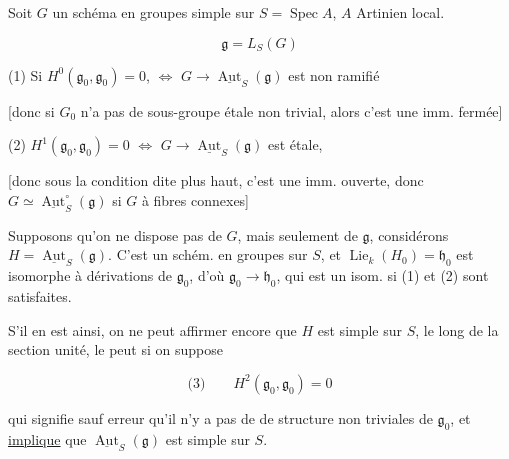
Soit \(G\) un schéma en groupes simple sur \(S=\operatorname{Spec} A\), \(A\) Artinien local.

\[
\mathfrak g=L_S(G)
\]

(1) Si \(H^0(\mathfrak g_0,\mathfrak g_0)=0\), \(\Longleftrightarrow\) \(G\longrightarrow\underline{\operatorname{Aut}}_S(\mathfrak g)\) est  non ramifié

[donc si \(G_0\) n'a pas de sous-groupe  étale  non trivial, alors c'est une imm. fermée]

(2)   \(H^1(\mathfrak g_0,\mathfrak g_0)=0\) \(\Longleftrightarrow\) \(G\longrightarrow\underline{\operatorname{Aut}}_S(\mathfrak g)\) est étale,

[donc sous la condition dite plus haut, c'est une imm. ouverte, donc \(G\simeq\underline{\operatorname{Aut}}_S^{\circ}(\mathfrak g)\) si \(G\) à fibres connexes]


Supposons qu'on ne dispose pas de \(G\), mais seulement de \(\mathfrak g\), considérons \(H=\underline{\operatorname{Aut}}_S(\mathfrak g)\).  C'est un schém. en groupes sur \(S\), et \(\operatorname{Lie}_k(H_0)=\mathfrak h_0\) est isomorphe à   dérivations de \(\mathfrak g_0\), d'où \(\mathfrak g_0\to\mathfrak h_0\), qui est un isom. si (1) et (2) sont satisfaites.

S'il en est ainsi, on ne peut affirmer encore que \(H\) est simple sur \(S\), \unsure{\(=\)|\(\simeq\)} le long de la section unité,   le peut si on suppose

\[
\text{(3)}\qquad H^2(\mathfrak g_0,\mathfrak g_0)=0
\]

qui signifie sauf erreur qu'il n'y a pas de  de structure  non triviales de \(\mathfrak g_0\), et \uline{implique} que  \(\underline{\operatorname{Aut}}_S(\mathfrak g)\) est simple sur \(S\).
